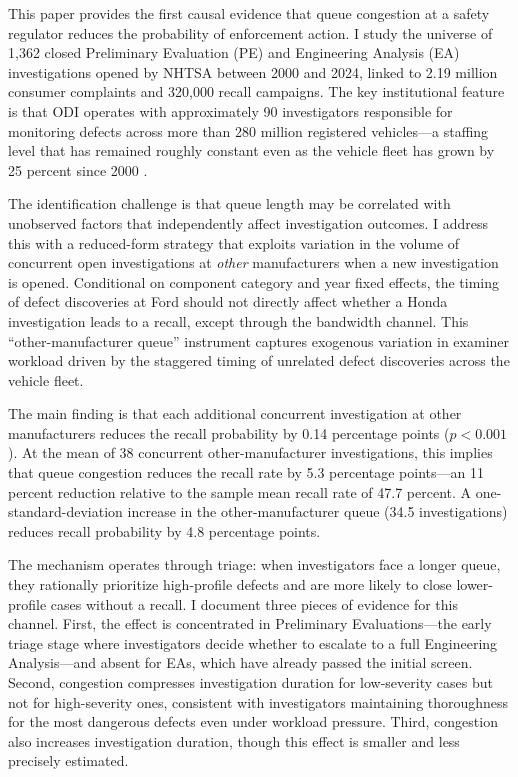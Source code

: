 \documentclass[12pt]{article}
\begin{document}
This paper provides the first causal evidence that queue congestion at a safety regulator reduces the probability of enforcement action. I study the universe of 1,362 closed Preliminary Evaluation (PE) and Engineering Analysis (EA) investigations opened by NHTSA between 2000 and 2024, linked to 2.19 million consumer complaints and 320,000 recall campaigns. The key institutional feature is that ODI operates with approximately 90 investigators responsible for monitoring defects across more than 280 million registered vehicles---a staffing level that has remained roughly constant even as the vehicle fleet has grown by 25 percent since 2000 \citep{dotig2023nhtsa}.

The identification challenge is that queue length may be correlated with unobserved factors that independently affect investigation outcomes. I address this with a reduced-form strategy that exploits variation in the volume of concurrent open investigations at \textit{other} manufacturers when a new investigation is opened. Conditional on component category and year fixed effects, the timing of defect discoveries at Ford should not directly affect whether a Honda investigation leads to a recall, except through the bandwidth channel. This ``other-manufacturer queue'' instrument captures exogenous variation in examiner workload driven by the staggered timing of unrelated defect discoveries across the vehicle fleet.

The main finding is that each additional concurrent investigation at other manufacturers reduces the recall probability by 0.14 percentage points ($p < 0.001$). At the mean of 38 concurrent other-manufacturer investigations, this implies that queue congestion reduces the recall rate by 5.3 percentage points---an 11 percent reduction relative to the sample mean recall rate of 47.7 percent. A one-standard-deviation increase in the other-manufacturer queue (34.5 investigations) reduces recall probability by 4.8 percentage points.

The mechanism operates through triage: when investigators face a longer queue, they rationally prioritize high-profile defects and are more likely to close lower-profile cases without a recall. I document three pieces of evidence for this channel. First, the effect is concentrated in Preliminary Evaluations---the early triage stage where investigators decide whether to escalate to a full Engineering Analysis---and absent for EAs, which have already passed the initial screen. Second, congestion compresses investigation duration for low-severity cases but not for high-severity ones, consistent with investigators maintaining thoroughness for the most dangerous defects even under workload pressure. Third, congestion also increases investigation duration, though this effect is smaller and less precisely estimated.
\end{document}

